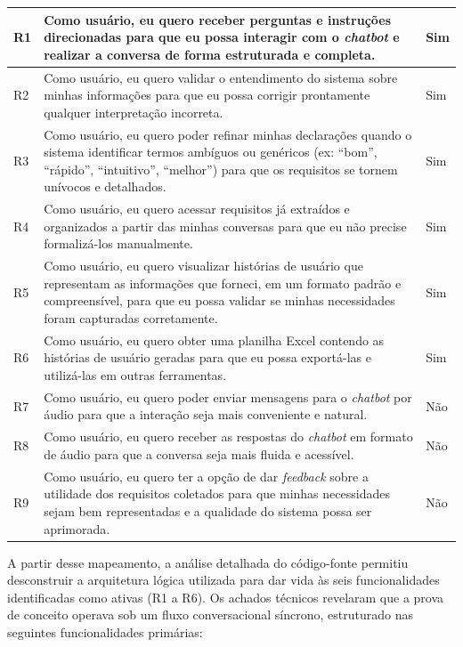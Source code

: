 {\begin{xltabular}{\textwidth}{|p{1cm}|X|p{3.5cm}|}
    R1 & Como usuário, eu quero receber perguntas e instruções direcionadas para que eu possa interagir com o \textit{chatbot} e realizar a conversa de forma estruturada e completa. & Sim \\
    \midrule
    R2 & Como usuário, eu quero validar o entendimento do sistema sobre minhas informações para que eu possa corrigir prontamente qualquer interpretação incorreta. & Sim \\
    \midrule
    R3 & Como usuário, eu quero poder refinar minhas declarações quando o sistema identificar termos ambíguos ou genéricos (ex: ``bom'', ``rápido'', ``intuitivo'', ``melhor'') para que os requisitos se tornem unívocos e detalhados. & Sim \\
    \midrule
    R4 & Como usuário, eu quero acessar requisitos já extraídos e organizados a partir das minhas conversas para que eu não precise formalizá-los manualmente. & Sim \\
    \midrule
    R5 & Como usuário, eu quero visualizar histórias de usuário que representam as informações que forneci, em um formato padrão e compreensível, para que eu possa validar se minhas necessidades foram capturadas corretamente. & Sim \\
    \midrule
    R6 & Como usuário, eu quero obter uma planilha Excel contendo as histórias de usuário geradas para que eu possa exportá-las e utilizá-las em outras ferramentas. & Sim \\
    \midrule
    R7 & Como usuário, eu quero poder enviar mensagens para o \textit{chatbot} por áudio para que a interação seja mais conveniente e natural. & Não \\
    \midrule
    R8 & Como usuário, eu quero receber as respostas do \textit{chatbot} em formato de áudio para que a conversa seja mais fluida e acessível. & Não \\
    \midrule
    R9 & Como usuário, eu quero ter a opção de dar \textit{feedback} sobre a utilidade dos requisitos coletados para que minhas necessidades sejam bem representadas e a qualidade do sistema possa ser aprimorada. & Não \\
\end{xltabular}
}

A partir desse mapeamento, a análise detalhada do código-fonte permitiu desconstruir a arquitetura lógica utilizada para dar vida às seis funcionalidades identificadas como ativas (R1 a R6). Os achados técnicos revelaram que a prova de conceito operava sob um fluxo conversacional síncrono, estruturado nas seguintes funcionalidades primárias:

